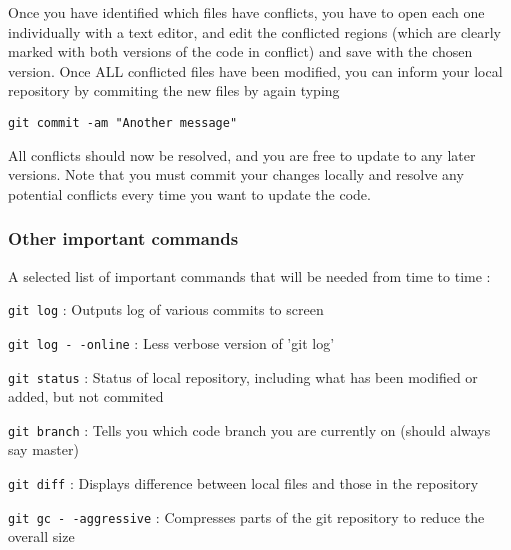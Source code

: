 \documentclass[a4paper]{article}
\newcommand{\var}[1]{\texttt{#1}}
\begin{document}
\noindent Once you have identified which files have conflicts, you have to open each one individually with a text editor, and edit the conflicted regions (which are clearly marked with both versions of the code in conflict) and save with the chosen version.  Once ALL conflicted files have been modified, you can inform your local repository by commiting the new files by again typing \newline

\var{git commit -am "Another message"} \newline

\noindent All conflicts should now be resolved, and you are free to update to any later versions.  Note that you must commit your changes locally and resolve any potential conflicts every time you want to update the code. 



\subsubsection{Other important commands}
A selected list of important commands that will be needed from time to time : \newline

\var{git log}           : Outputs log of various commits to screen

\var{git log -\,-online}  : Less verbose version of 'git log'

\var{git status}        : Status of local repository, including what has been
                          modified or added, but not commited

\var{git branch}        : Tells you which code branch you are currently on
                         (should always say master)

\var{git diff}          : Displays difference between local files and those in
                          the repository

\var{git gc -\,-aggressive} : Compresses parts of the git repository to reduce the overall size




\end{document}
